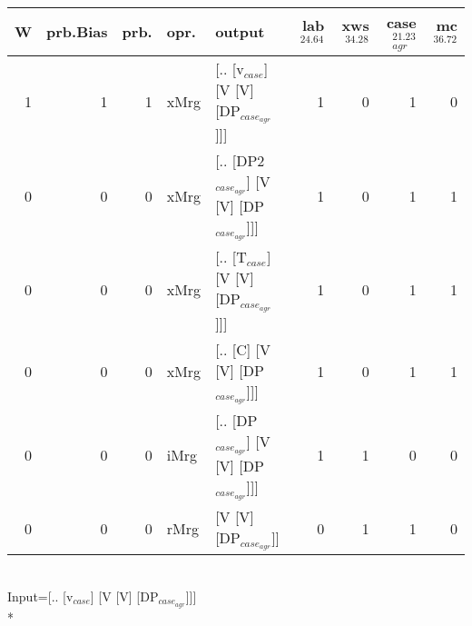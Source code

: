\begin{tabularx}{\linewidth}{rrrlXrrrr}
\hline
   W &   prb.Bias &   prb. & opr.   & output                                    &   lab$^{24.64}$ &   xws$^{34.28}$ &   case$_{agr}^{21.23}$ &   mc$^{36.72}$ \\
\hline
   1 &       1 &   1 & xMrg & [.. [v$_{case}$] [V [V] [DP$_{case_{agr}}$]]]       &             1 &             0 &                  1 &            0 \\
   0 &       0 &   0 & xMrg & [.. [DP2$_{case_{agr}}$] [V [V] [DP$_{case_{agr}}$]]] &             1 &             0 &                  1 &            1 \\
   0 &       0 &   0 & xMrg & [.. [T$_{case}$] [V [V] [DP$_{case_{agr}}$]]]       &             1 &             0 &                  1 &            1 \\
   0 &       0 &   0 & xMrg & [.. [C] [V [V] [DP$_{case_{agr}}$]]]            &             1 &             0 &                  1 &            1 \\
   0 &       0 &   0 & iMrg & [.. [DP$_{case_{agr}}$] [V [V] [DP$_{case_{agr}}$]]]  &             1 &             1 &                  0 &            0 \\
   0 &       0 &   0 & rMrg & [V [V] [DP$_{case_{agr}}$]]                     &             0 &             1 &                  1 &            0 \\
\hline
\end{tabularx}\endgroup\\
\begingroup\scriptsize Input=[.. [v$_{case}$] [V [V] [DP$_{case_{agr}}$]]]\\*
